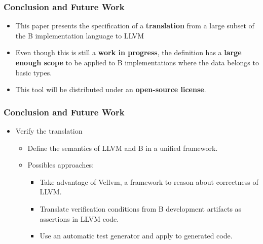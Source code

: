 \documentclass[12pt]{beamer}
\begin{document}
\begin{frame}
	\frametitle{Conclusion and Future Work}
	\begin{itemize}
	\item This paper presents the specification of a \textbf{translation} from a large subset of the B implementation language to LLVM
 	
\item  Even though this is still a\textbf{ work in progress}, the definition has a \textbf{large enough scope} to be applied to B implementations where the data belongs to basic types. %
	\item This tool will be distributed under an \textbf{open-source license}.
	\end{itemize}
\end{frame}

\begin{frame} \frametitle{Conclusion and Future Work}
	 \begin{itemize}
	 \item Verify the translation
	\begin{itemize} 
	\item Define the semantics of LLVM and B in a unified framework. 
	 \item Possibles approaches:
	\begin{itemize} 
	\item Take advantage of Vellvm, a framework to reason about
correctness of LLVM. 
	 \item Translate verification conditions from B development artifacts as assertions in LLVM code.
	\item Use an automatic test generator and apply to generated code.
	\end{itemize}
	\end{itemize} 
	\end{itemize} 
\end{frame}
\end{document}
